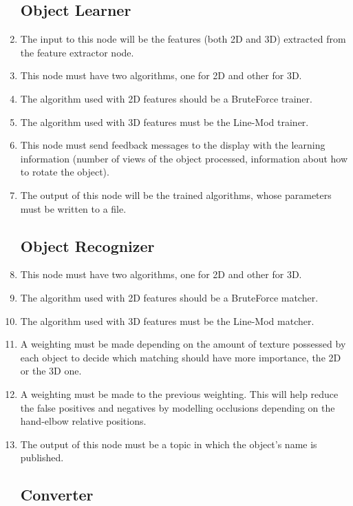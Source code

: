 \documentclass{article}
\makeatletter
\def\threedigits#1{\expandafter\@threedigits\csname c@#1\endcsname}
\def\@threedigits#1{%
  \ifnum#1<100 0\fi
  \ifnum#1<10 0\fi
  \number#1}
\makeatother
\begin{document}
\begin{enumerate}[label=\textbf{FR\threedigits*}, leftmargin=2cm]
\subsection{Object Learner}
	\item The input to this node will be the features (both 2D and 3D) extracted from the feature extractor node. 
	\item This node must have two algorithms, one for 2D and other for 3D. 
	\item The algorithm used with 2D features should be a BruteForce trainer.
	\item The algorithm used with 3D features must be the Line-Mod trainer. 	
	\item This node must send feedback messages to the display with the learning information (number of views of the object processed, information about how to rotate the object).
	\item The output of this node will be the trained algorithms, whose parameters must be written to a file. 

\subsection{Object Recognizer}
	\item This node must have two algorithms, one for 2D and other for 3D. 
	\item The algorithm used with 2D features should be a BruteForce matcher.
	\item The algorithm used with 3D features must be the Line-Mod matcher. 
	\item A weighting must be made depending on the amount of texture possessed by each object to decide which matching should have more importance, the 2D or the 3D one. 
	\item A weighting must be made to the previous weighting. This will help reduce the false positives and negatives by modelling occlusions depending on the hand-elbow relative positions. 
	\item The output of this node must be a topic in which the object's name is published.
	




\subsection{Converter}


\end{enumerate}
\end{document}
